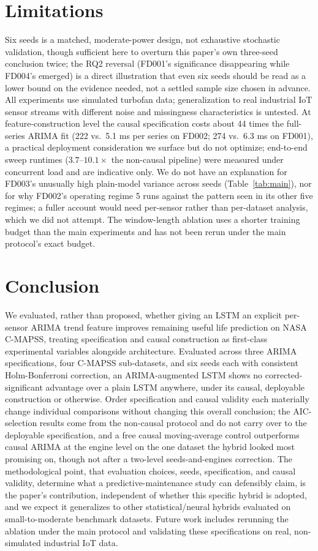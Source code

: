 \documentclass[conference]{IEEEtran}
\begin{document}
\section{Limitations}
Six seeds is a matched, moderate-power design, not exhaustive stochastic validation, though sufficient here to overturn this paper's own three-seed conclusion twice; the RQ2 reversal (FD001's significance disappearing while FD004's emerged) is a direct illustration that even six seeds should be read as a lower bound on the evidence needed, not a settled sample size chosen in advance. All experiments use simulated turbofan data; generalization to real industrial IoT sensor streams with different noise and missingness characteristics is untested. At feature-construction level the causal specification costs about 44 times the full-series ARIMA fit (222 vs.\ 5.1 ms per series on FD002; 274 vs.\ 6.3 ms on FD001), a practical deployment consideration we surface but do not optimize; end-to-end sweep runtimes ($3.7$--$10.1\times$ the non-causal pipeline) were measured under concurrent load and are indicative only. We do not have an explanation for FD003's unusually high plain-model variance across seeds (Table~\ref{tab:main}), nor for why FD002's operating regime 5 runs against the pattern seen in its other five regimes; a fuller account would need per-sensor rather than per-dataset analysis, which we did not attempt. The window-length ablation uses a shorter training budget than the main experiments and has not been rerun under the main protocol's exact budget.

\section{Conclusion}
We evaluated, rather than proposed, whether giving an LSTM an explicit per-sensor ARIMA trend feature improves remaining useful life prediction on NASA C-MAPSS, treating specification and causal construction as first-class experimental variables alongside architecture. Evaluated across three ARIMA specifications, four C-MAPSS sub-datasets, and six seeds each with consistent Holm-Bonferroni correction, an ARIMA-augmented LSTM shows no corrected-significant advantage over a plain LSTM anywhere, under its causal, deployable construction or otherwise. Order specification and causal validity each materially change individual comparisons without changing this overall conclusion; the AIC-selection results come from the non-causal protocol and do not carry over to the deployable specification, and a free causal moving-average control outperforms causal ARIMA at the engine level on the one dataset the hybrid looked most promising on, though not after a two-level seeds-and-engines correction. The methodological point, that evaluation choices, seeds, specification, and causal validity, determine what a predictive-maintenance study can defensibly claim, is the paper's contribution, independent of whether this specific hybrid is adopted, and we expect it generalizes to other statistical/neural hybrids evaluated on small-to-moderate benchmark datasets. Future work includes rerunning the ablation under the main protocol and validating these specifications on real, non-simulated industrial IoT data.
\end{document}
